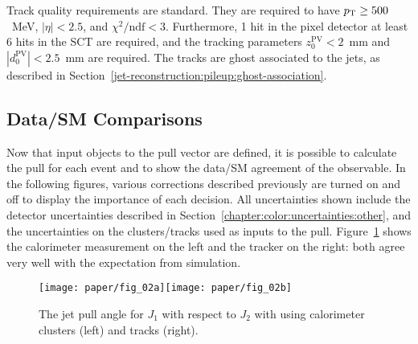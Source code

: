 Track quality requirements are standard. They are required to have $p_{\text{T}} \geq 500$~MeV, $|\eta| < 2.5$, and $\chi^2/\mathrm{ndf} < 3$. Furthermore, 1 hit in the pixel detector at least 6 hits in the SCT are required, and the tracking parameters $z_0^\mathrm{PV} < 2$~mm and $|d_0^\mathrm{PV}| < 2.5$~mm are required. The tracks are ghost associated to the jets, as described in Section~\ref{jet-reconstruction:pileup:ghost-association}.

\subsection{Data/SM Comparisons}
\label{chapter:color:comparisons}

Now that input objects to the pull vector are defined, it is possible to calculate the pull for each event and to show the data/SM agreement of the observable. In the following figures, various corrections described previously are turned on and off to display the importance of each decision. All uncertainties shown include the detector uncertainties described in Section~\ref{chapter:color:uncertainties:other}, and the uncertainties on the clusters/tracks used as inputs to the pull. Figure~\ref{fig:color:substructure:pull_fixed} shows the calorimeter measurement on the left and the tracker on the right: both agree very well with the expectation from simulation.


\begin{figure}[h!]
\begin{center}
\texttt{[image: paper/fig\_02a]}\texttt{[image: paper/fig\_02b]}
 \caption{The jet pull angle for $J_1$ with respect to $J_2$ with using calorimeter clusters (left) and tracks (right).}
 \label{fig:color:substructure:pull_fixed}
  \end{center}
\end{figure}




